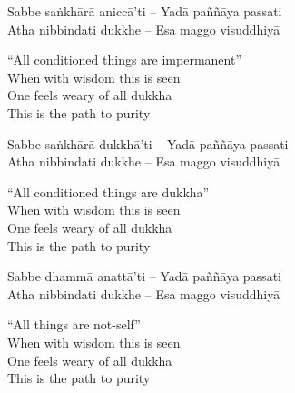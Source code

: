 \begin{leader}
\end{leader}

\begin{twochants}
  Sabbe saṅkhārā aniccā’ti – Yadā paññāya passati\\
  Atha nibbindati dukkhe – Esa maggo visuddhiyā\\
\end{twochants}

\begin{english}
  ``All conditioned things are impermanent''\\
  When with wisdom this is seen\\
  One feels weary of all dukkha\\
  This is the path to purity
\end{english}

\begin{twochants}
  Sabbe saṅkhārā dukkhā’ti – Yadā paññāya passati\\
  Atha nibbindati dukkhe – Esa maggo visuddhiyā\\
\end{twochants}

\begin{english}
  ``All conditioned things are dukkha''\\
  When with wisdom this is seen\\
  One feels weary of all dukkha\\
  This is the path to purity
\end{english}

\begin{twochants}
  Sabbe dhammā anattā’ti – Yadā paññāya passati\\
  Atha nibbindati dukkhe – Esa maggo visuddhiyā\\
\end{twochants}

\begin{english}
  ``All things are not-self''\\
  When with wisdom this is seen\\
  One feels weary of all dukkha\\
  This is the path to purity
\end{english}

